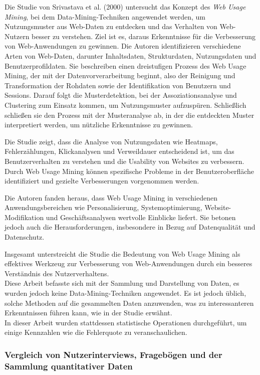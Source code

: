 \documentclass[12pt,oneside]{article}
\begin{document}
Die Studie von Srivastava et al. (2000)\cite{Srivastava2000} untersucht das Konzept des \textit{Web Usage Mining}, bei dem Data-Mining-Techniken angewendet werden, um Nutzungsmuster aus Web-Daten zu entdecken und das Verhalten von Web-Nutzern besser zu verstehen. Ziel ist es, daraus Erkenntnisse für die Verbesserung von Web-Anwendungen zu gewinnen. Die Autoren identifizieren verschiedene Arten von Web-Daten, darunter Inhaltsdaten, Strukturdaten, Nutzungsdaten und Benutzerprofildaten. Sie beschreiben einen dreistufigen Prozess des Web Usage Mining, der mit der Datenvorverarbeitung beginnt, also der Reinigung und Transformation der Rohdaten sowie der Identifikation von Benutzern und Sessions. Darauf folgt die Musterdetektion, bei der Assoziationsanalyse und Clustering zum Einsatz kommen, um Nutzungsmuster aufzuspüren. Schließlich schließen sie den Prozess mit der Musteranalyse ab, in der die entdeckten Muster interpretiert werden, um nützliche Erkenntnisse zu gewinnen.

Die Studie zeigt, dass die Analyse von Nutzungsdaten wie Heatmaps, Fehlerzählungen, Klickanalysen und Verweildauer entscheidend ist, um das Benutzerverhalten zu verstehen und die Usability von Websites zu verbessern. Durch Web Usage Mining können spezifische Probleme in der Benutzeroberfläche identifiziert und gezielte Verbesserungen vorgenommen werden.

Die Autoren fanden heraus, dass Web Usage Mining in verschiedenen Anwendungsbereichen wie Personalisierung, Systemoptimierung, Website-Modifikation und Geschäftsanalysen wertvolle Einblicke liefert. Sie betonen jedoch auch die Herausforderungen, insbesondere in Bezug auf Datenqualität und Datenschutz.

Insgesamt unterstreicht die Studie die Bedeutung von Web Usage Mining als effektives Werkzeug zur Verbesserung von Web-Anwendungen durch ein besseres Verständnis des Nutzerverhaltens.\\ 
Diese Arbeit befasste sich mit der Sammlung und Darstellung von Daten, es wurden jedoch keine Data-Mining-Techniken angewendet. Es ist jedoch üblich, solche Methoden auf die gesammelten Daten anzuwenden, was zu interessanteren Erkenntnissen führen kann, wie in der Studie erwähnt.\\
 In dieser Arbeit wurden stattdessen statistische Operationen durchgeführt, um einige Kennzahlen wie die Fehlerquote zu veranschaulichen.

\subsubsection{Vergleich von Nutzerinterviews, Fragebögen und der Sammlung quantitativer Daten}
\end{document}
